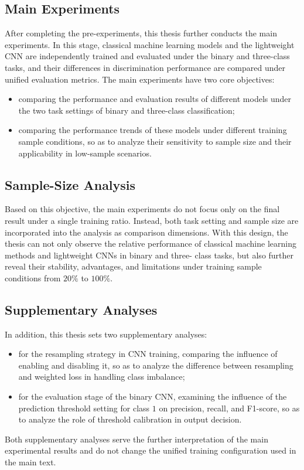 \subsection{Main Experiments}
\par After completing the pre-experiments, this thesis further conducts the
main experiments. In this stage, classical machine learning models and the
lightweight CNN are independently trained and evaluated under the binary and
three-class tasks, and their differences in discrimination performance are
compared under unified evaluation metrics. The main experiments have two core
objectives:
\begin{itemize}
    \item comparing the performance and evaluation results of different models
    under the two task settings of binary and three-class classification;
    \item comparing the performance trends of these models under different
    training sample conditions, so as to analyze their sensitivity to sample
    size and their applicability in low-sample scenarios.
\end{itemize}

\subsection{Sample-Size Analysis}
\par Based on this objective, the main experiments do not focus only on the
final result under a single training ratio. Instead, both task setting and
sample size are incorporated into the analysis as comparison dimensions. With
this design, the thesis can not only observe the relative performance of
classical machine learning methods and lightweight CNNs in binary and three-
class tasks, but also further reveal their stability, advantages, and
limitations under training sample conditions from $20\%$ to $100\%$.

\subsection{Supplementary Analyses}
\par In addition, this thesis sets two supplementary analyses:
\begin{itemize}
    \item for the resampling strategy in CNN training, comparing the influence
    of enabling and disabling it, so as to analyze the difference between
    resampling and weighted loss in handling class imbalance;
    \item for the evaluation stage of the binary CNN, examining the influence
    of the prediction threshold setting for class $1$ on precision, recall,
    and F1-score, so as to analyze the role of threshold calibration in output
    decision.
\end{itemize}
\par Both supplementary analyses serve the further interpretation of the main
experimental results and do not change the unified training configuration used
in the main text.
